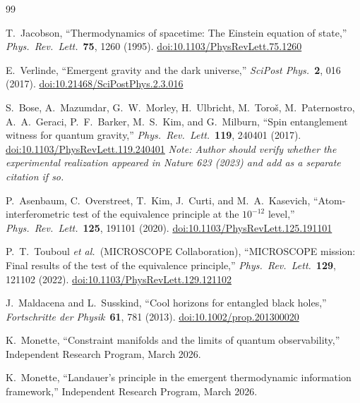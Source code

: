 \documentclass[12pt,letterpaper]{article}
\theoremstyle{plain}
\theoremstyle{definition}
\theoremstyle{remark}
\begin{document}

\begin{thebibliography}{99}

T.~Jacobson,
``Thermodynamics of spacetime: The Einstein equation of state,''
\textit{Phys.\ Rev.\ Lett.}\ \textbf{75}, 1260 (1995).
\href{https://doi.org/10.1103/PhysRevLett.75.1260}{doi:10.1103/PhysRevLett.75.1260}

E.~Verlinde,
``Emergent gravity and the dark universe,''
\textit{SciPost Phys.}\ \textbf{2}, 016 (2017).
\href{https://doi.org/10.21468/SciPostPhys.2.3.016}{doi:10.21468/SciPostPhys.2.3.016}

S.~Bose, A.~Mazumdar, G.~W.~Morley, H.~Ulbricht, M.~Toro\v{s},
M.~Paternostro, A.~A.~Geraci, P.~F.~Barker, M.~S.~Kim, and G.~Milburn,
``Spin entanglement witness for quantum gravity,''
\textit{Phys.\ Rev.\ Lett.}\ \textbf{119}, 240401 (2017).
\href{https://doi.org/10.1103/PhysRevLett.119.240401}{doi:10.1103/PhysRevLett.119.240401}
\newline
\textit{Note: Author should verify whether the experimental realization appeared in Nature
623 (2023) and add as a separate citation if so.}

P.~Asenbaum, C.~Overstreet, T.~Kim, J.~Curti, and M.~A.~Kasevich,
``Atom-interferometric test of the equivalence principle at the $10^{-12}$ level,''
\textit{Phys.\ Rev.\ Lett.}\ \textbf{125}, 191101 (2020).
\href{https://doi.org/10.1103/PhysRevLett.125.191101}{doi:10.1103/PhysRevLett.125.191101}

P.~T.~Touboul \textit{et al.}\ (MICROSCOPE Collaboration),
``MICROSCOPE mission: Final results of the test of the equivalence principle,''
\textit{Phys.\ Rev.\ Lett.}\ \textbf{129}, 121102 (2022).
\href{https://doi.org/10.1103/PhysRevLett.129.121102}{doi:10.1103/PhysRevLett.129.121102}

J.~Maldacena and L.~Susskind,
``Cool horizons for entangled black holes,''
\textit{Fortschritte der Physik}\ \textbf{61}, 781 (2013).
\href{https://doi.org/10.1002/prop.201300020}{doi:10.1002/prop.201300020}

K.~Monette,
``Constraint manifolds and the limits of quantum observability,''
Independent Research Program, March 2026.

K.~Monette,
``Landauer's principle in the emergent thermodynamic information framework,''
Independent Research Program, March 2026.

\end{thebibliography}
\end{document}
